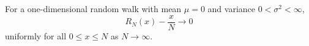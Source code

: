 For a one-dimensional random walk with mean $\mu = 0$ and variance $0 < \sigma^2 < \infty$,
$$R_N(x) - \frac{x}{N} \to 0$$
uniformly for all $0 \leq x \leq N$ as $N \to \infty$.
